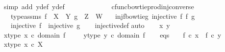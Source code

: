 \begin{isabellebody}
\ {\isacharparenleft}{\kern0pt}simp\ add{\isacharcolon}{\kern0pt}\ y{}{\isacharunderscore}{\kern0pt}def\ y{}{\isacharunderscore}{\kern0pt}def{\isacharparenright}{\kern0pt}\isanewline
\ \ \ \ \ \ \isamarkupfalse%
\isanewline
\ \ \ \isamarkupfalse%
\isanewline
\ \isamarkupfalse%
%
\endisatagproof
{\isafoldproof}%
%
\isadelimproof
\isanewline
%
\endisadelimproof
\isanewline
{}\isamarkupfalse%
\ cfunc{\isacharunderscore}{\kern0pt}bowtieprod{\isacharunderscore}{\kern0pt}inj{\isacharunderscore}{\kern0pt}converse{\isacharcolon}{\kern0pt}\isanewline
\ \ \ type{\isacharunderscore}{\kern0pt}assms{\isacharcolon}{\kern0pt}\ {\isachardoublequoteopen}f\ {\isacharcolon}{\kern0pt}\ X\ {\isasymrightarrow}\ Y{\isachardoublequoteclose}\ {\isachardoublequoteopen}g\ {\isacharcolon}{\kern0pt}\ Z\ {\isasymrightarrow}\ W{\isachardoublequoteclose}\isanewline
\ \ \ inj{\isacharunderscore}{\kern0pt}f{\isacharunderscore}{\kern0pt}bowtie{\isacharunderscore}{\kern0pt}g{\isacharcolon}{\kern0pt}\ {\isachardoublequoteopen}injective\ {\isacharparenleft}{\kern0pt}f\ {\isasymbowtie}\isactrlsub f\ g{\isacharparenright}{\kern0pt}{\isachardoublequoteclose}\isanewline
\ \ \ {\isachardoublequoteopen}injective\ f\ {\isasymand}\ injective\ g{\isachardoublequoteclose}\isanewline
%
\isadelimproof
\ \ %
\endisadelimproof
%
\isatagproof
{}\isamarkupfalse%
\ injective{\isacharunderscore}{\kern0pt}def\isanewline
{}\isamarkupfalse%
{\isacharparenleft}{\kern0pt}auto{\isacharparenright}{\kern0pt}\isanewline
\ \ \isamarkupfalse%
\ x\ y\ \isanewline
\ \ \isamarkupfalse%
\ x{\isacharunderscore}{\kern0pt}type{\isacharcolon}{\kern0pt}\ {\isachardoublequoteopen}x\ {\isasymin}\isactrlsub c\ domain\ f{\isachardoublequoteclose}\ \isanewline
\ \ \isamarkupfalse%
\ y{\isacharunderscore}{\kern0pt}type{\isacharcolon}{\kern0pt}\ {\isachardoublequoteopen}y\ {\isasymin}\isactrlsub c\ domain\ f{\isachardoublequoteclose}\isanewline
\ \ \isamarkupfalse%
\ eqs{\isacharcolon}{\kern0pt}\ \ \ \ {\isachardoublequoteopen}f\ {\isasymcirc}\isactrlsub c\ x\ {\isacharequal}{\kern0pt}\ f\ {\isasymcirc}\isactrlsub c\ y{\isachardoublequoteclose}\isanewline
\isanewline
\ \ \isamarkupfalse%
\ x{\isacharunderscore}{\kern0pt}type{}{\isacharcolon}{\kern0pt}\ {\isachardoublequoteopen}x\ {\isasymin}\isactrlsub c\ X{\isachardoublequoteclose}\isanewline
\ \ \ \ \isamarkupfalse%

\end{isabellebody}
